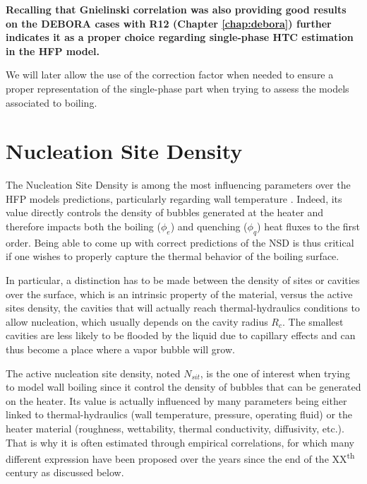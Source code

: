 \npar
\textbf{Recalling that Gnielinski correlation was also providing good results on the DEBORA cases with R12 (Chapter \ref{chap:debora}) further indicates it as a proper choice regarding single-phase HTC estimation in the HFP model.} 

\npar
\begin{note*}{}
We will later allow the use of the correction factor when needed to ensure a proper representation of the single-phase part when trying to assess the models associated to boiling.
\end{note*}



\section{Nucleation Site Density}
\label{sec:NSD}

The Nucleation Site Density is among the most influencing parameters over the HFP models predictions, particularly regarding wall temperature \cite{favre_neptune_2022}. Indeed, its value directly controls the density of bubbles generated at the heater and therefore impacts both the boiling ($\phi_{e}$) and quenching ($\phi_{q}$) heat fluxes to the first order. Being able to come up with correct predictions of the NSD is thus critical if one wishes to properly capture the thermal behavior of the boiling surface.

\npar

In particular, a distinction has to be made between the density of sites or cavities over the surface, which is an intrinsic property of the material, versus the active sites density, \ie the cavities that will actually reach thermal-hydraulics conditions to allow nucleation, which usually depends on the cavity radius $R_{c}$. The smallest cavities are less likely to be flooded by the liquid due to capillary effects and can thus become a place where a vapor bubble will grow. 

\npar
The active nucleation site density, noted $N_{sit}$, is the one of interest when trying to model wall boiling since it control the density of bubbles that can be generated on the heater. Its value is actually influenced by many parameters being either linked to thermal-hydraulics (wall temperature, pressure, operating fluid) or the heater material (roughness, wettability, thermal conductivity, diffusivity, etc.). That is why it is often estimated through empirical correlations, for which many different expression have been proposed over the years since the end of the XX\textsuperscript{th} century as discussed below.





